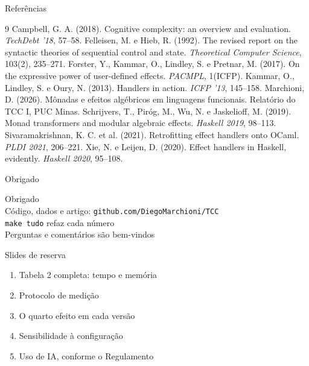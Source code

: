 \documentclass[aspectratio=169,10pt]{beamer}
\begin{document}
\begin{frame}{Referências}
  \begin{thebibliography}{9}
    \small
     Campbell, G. A. (2018). Cognitive complexity: an overview and evaluation. \emph{TechDebt '18}, 57--58.
     Felleisen, M. e Hieb, R. (1992). The revised report on the syntactic theories of sequential control and state. \emph{Theoretical Computer Science}, 103(2), 235--271.
     Forster, Y., Kammar, O., Lindley, S. e Pretnar, M. (2017). On the expressive power of user-defined effects. \emph{PACMPL}, 1(ICFP).
     Kammar, O., Lindley, S. e Oury, N. (2013). Handlers in action. \emph{ICFP '13}, 145--158.
     Marchioni, D. (2026). Mônadas e efeitos algébricos em linguagens funcionais. Relatório do TCC I, PUC Minas.
     Schrijvers, T., Piróg, M., Wu, N. e Jaskelioff, M. (2019). Monad transformers and modular algebraic effects. \emph{Haskell 2019}, 98--113.
     Sivaramakrishnan, K. C. et al. (2021). Retrofitting effect handlers onto OCaml. \emph{PLDI 2021}, 206--221.
     Xie, N. e Leijen, D. (2020). Effect handlers in Haskell, evidently. \emph{Haskell 2020}, 95--108.
  \end{thebibliography}
\end{frame}

\begin{frame}{Obrigado}
  \begin{center}
    {\Large Obrigado}\\[12pt]
    Código, dados e artigo: \texttt{github.com/DiegoMarchioni/TCC}\\[4pt]
    \texttt{make tudo} refaz cada número\\[16pt]
    {\large Perguntas e comentários são bem-vindos}
  \end{center}
\end{frame}

\appendix

\begin{frame}{Slides de reserva}
  \begin{enumerate}
    \item[A1] Tabela 2 completa: tempo e memória
    \item[A2] Protocolo de medição
    \item[A3] O quarto efeito em cada versão
    \item[A4] Sensibilidade à configuração
    \item[A5] Uso de IA, conforme o Regulamento
  \end{enumerate}
\end{frame}
\end{document}
